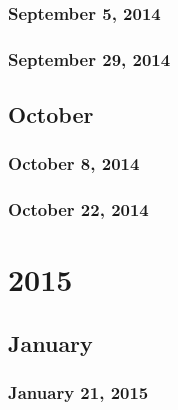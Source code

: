 \section{September 5, 2014}

\section{September 29, 2014}

\chapter{October}
\section{October 8, 2014}

\section{October 22, 2014}

\part{2015}
\chapter{January}
\section{January 21, 2015}

